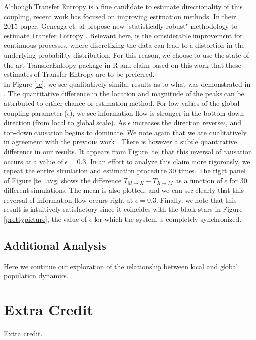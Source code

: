 \documentclass[conference]{IEEEtran}
\begin{document}
\noindent Although Transfer Entropy is a fine candidate to estimate directionality of this coupling, recent work has focused on improving estimation methods. In their 2015 paper, Gencaga et. al propose new "statistically robust" methodology to estimate Transfer Entropy \cite{recipe}. Relevant here, is the considerable improvement for continuous processes, where discretizing the data can lead to a distortion in the underlying probability distribution. For this reason, we choose to use the state of the art TransferEntropy package in R and claim based on this work that these estimates of Transfer Entropy are to be preferred. \\

\noindent In Figure \ref{te}, we see qualitatively similar results as to what was demonstrated in \cite{Walker}. The quantitative difference in the location and magnitude of the peaks can be attributed to either chance or estimation method. For low values of the global coupling parameter ($\epsilon$), we see information flow is stronger in the bottom-down direction (from local to global scale). As $\epsilon$ increases the direction reverses, and top-down causation begins to dominate. We note again that we are qualitatively in agreement with the previous work \cite{Walker}. There is however a subtle quantitative difference in our results. It appears from Figure \ref{te} that this reversal of causation occurs at a value of $\epsilon = 0.3$. In an effort to analyze this claim more rigorously, we repeat the entire simulation and estimation procedure $30$ times. The right panel of Figure \ref{te_avg} shows the difference $T_{M\rightarrow X} - T_{X \rightarrow M}$ as a function of $\epsilon$ for 30 different simulations. The mean is also plotted, and we can see clearly that this reversal of information flow occurs right at $\epsilon = 0.3$. Finally, we note that this result is intuitively satisfactory since it coincides with the black stars in Figure \ref{prettypicture}, the value of $\epsilon$ for which the system is completely synchronized.

\subsection{Additional Analysis}
Here we continue our exploration of the relationship between local and global population dynamics.


\section{Extra Credit}  Extra credit.  
\end{document}
